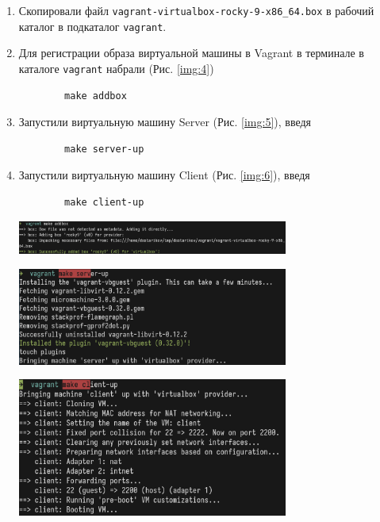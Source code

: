 \begin{enumerate}
    \item Скопировали файл \texttt{vagrant-virtualbox-rocky-9-x86\_64.box} в рабочий каталог в подкаталог \texttt{vagrant}.
    \item Для регистрации образа виртуальной машины в Vagrant в терминале в каталоге \texttt{vagrant} набрали (Рис. \ref{img:4})
        \begin{verbatim}
        make addbox
        \end{verbatim}
    \item Запустили виртуальную машину Server (Рис. \ref{img:5}), введя
        \begin{verbatim}
        make server-up
        \end{verbatim}
    \item Запустили виртуальную машину Client (Рис. \ref{img:6}), введя
        \begin{verbatim}
        make client-up
        \end{verbatim}
    \begin{center}
        \centering
        \includegraphics[width=0.7\textwidth]{../images/img4.png}
        \label{img:4}
    \end{center}
    \begin{center}
        \centering
        \includegraphics[width=0.7\textwidth]{../images/img5.png}
        \label{img:5}
    \end{center}
    \begin{center}
        \centering
        \includegraphics[width=0.7\textwidth]{../images/img6.png}

\end{center}
\end{enumerate}
